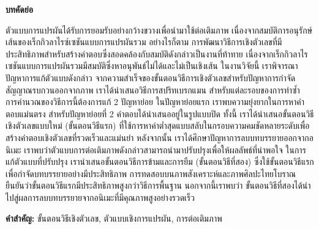 \thispagestyle{empty}
\vspace{2 cm}
{\huge \bf บทคัดย่อ}

\vspace{2 cm}

\hspace{1cm} ตัวแบบการแปรผันได้รับการยอมรับอย่างกว้างขวางเพื่อนำมาใช้ต่อเติมภาพ เนื่องจากสมบัติการอนุรักษ์เส้นของเร็กกิวลาไรซ์เซชันแบบการแปรผันรวม อย่างไรก็ตาม การพัฒนาวิธีการเชิงตัวเลขที่มีประสิทธิภาพสำหรับสร้างคำตอบซึ่งสอดคล้องกับสมบัติดังกล่าวเป็นงานที่ท้าทาย เนื่องจากเร็กกิวลาไรเซชันแบบการแปรผันรวมมีสมบัติซึ่งหาอนุพันธ์ไม่ได้และไม่เป็นเชิงเส้น ในงานวิจัยนี้ เราพิจารณาปัญหาการแก้ตัวแบบดังกล่าว จากความสำเร็จของขั้นตอนวิธีการเชิงตัวเลขสำหรับปัญหาการกำจัดสัญญาณรบกวนออกจากภาพ เราได้นำเสนอวิธีการสปริทเบรกแมน สำหรับแต่ละรอบของการทำซ้ำ การคำนวณของวิธีการนี้ต้องการแก้ 2 ปัญหาย่อย ในปัญหาย่อยแรก เราพบความยุ่งยากในการหาคำตอบแม่นตรง สำหรับปัญหาย่อยที่ 2 คำตอบได้นำเสนออยู่ในรูปแบบปิด ทั้งนี้ เราได้นำเสนอขั้นตอนวิธีเชิงตัวเลขแบบใหม่ (ขั้นตอนวิธีแรก) ที่ใช้การหาค่าต่ำสุดแบบสลับในกรอบความคมชัดหลายระดับเพื่อสร้างคำตอบเชิงตัวเลขที่รวดเร็วและแม่นยำ หลังจากนั้น เราได้ศึกษาปัญหาการลบบทบรรยายออกจากอนิเมะ เราพบว่าตัวแบบการต่อเติมภาพดังกล่าวสามารถนำมาปรับปรุงเพื่อให้ผลลัพธ์ที่น่าพอใจ ในการแก้ตัวแบบที่ปรับปรุง เรานำเสนอขั้นตอนวิธีการข้ามและการยืม (ขั้นตอนวิธีที่สอง) ซึ่งใช้ขั้นตอนวิธีแรกเพื่อกำจัดบทบรรยายอย่างมีประสิทธิภาพ การทดสอบบนภาพสังเคราะห์และภาพศิลปะไทยโบราณยืนยันว่าขั้นตอนวิธีแรกมีประสิทธิภาพสูงกว่าวิธีการพื้นฐาน นอกจากนี้เราพบว่า ขั้นตอนวิธีที่สองได้นำไปสู่ผลการลบบทบรรยายจากอนิเมะที่มีคุณภาพสูงอย่างรวดเร็ว

\vspace{1 cm}
{\bf{คำสำคัญ:}} ขั้นตอนวิธีเชิงตัวเลข, ตัวแบบเชิงการแปรผัน, การต่อเติมภาพ\\
\newpage